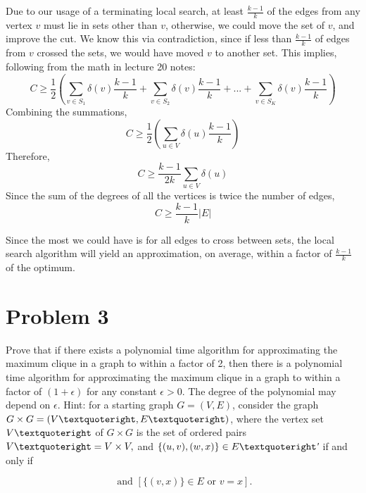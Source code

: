 \documentclass[11pt]{article}
\begin{document}
Due to our usage of a terminating local search, at least $\frac{k-1}{k}$ of the edges from any vertex $v$ must lie in sets other than $v$, otherwise, we could move the set of $v$, and improve the cut. We know this via contradiction, since if less than $\frac{k-1}{k}$ of edges from $v$ crossed the sets, we would have  moved $v$ to another set. This implies, following from the math in lecture 20 notes:
\begin{equation}
	C \geq \frac{1}{2}(\sum_{v \in S_1} \delta(v)\frac{k-1}{k} + \sum_{v \in S_2} \delta(v)\frac{k-1}{k} + ... + \sum_{v \in S_K} \delta(v)\frac{k-1}{k})	
\end{equation}
Combining the summations,
\begin{equation}
	C \geq \frac{1}{2}(\sum_{u \in V} \delta(u)\frac{k-1}{k})	
\end{equation}
Therefore,
\begin{equation}
	C \geq \frac{k-1}{2k}\sum_{u \in V} \delta(u)
\end{equation}
Since the sum of the degrees of all the vertices is twice the number of edges,
\begin{equation}
	C \geq \frac{k-1}{k}|E|
\end{equation}

Since the most we could have is for all edges to cross between sets, the local search algorithm will yield an approximation, on average, within a factor of $\frac{k-1}{k}$ of the optimum.

\section{Problem 3}
Prove that if there exists a polynomial time algorithm for approximating the maximum clique in a graph to within a factor of 2, then there is a polynomial time algorithm for approximating the maximum clique in a graph to within a factor of $(1 + \epsilon)$ for any constant $\epsilon > 0$. The degree of the polynomial may depend on $\epsilon$. Hint: for a starting graph $G = (V,E)$, consider the graph $G \times G = (V \textquoteright ,E\textquoteright)$, where the vertex set $V\textquoteright$ of $G \times G$ is the set of ordered pairs $V\textquoteright = V \times V,$ and $\{(u,v),(w,x)\} \in E\textquoteright$′ if and only if

\begin{equation}
[\{(u,w)\}\in E \text{ or } u=w] \text{ and } [\{(v,x)\}\in E \text{ or } v=x].			
\end{equation}
\end{document}
